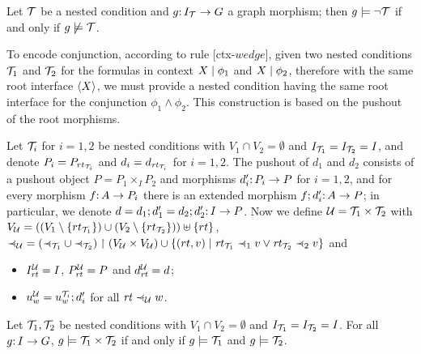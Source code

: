 \begin{proposition}
	\label{pr:negation satisfaction}
Let ${\mathcal{T}}$ be a {\proper} nested condition and $g{:}\, I_{\mathcal{T}}\rightarrow G$ a graph morphism; then $g\models \neg{\mathcal{T}}$ if and only if $g\not\models{\mathcal{T}}$.
\end{proposition}

To encode conjunction, according to rule [ctx-$wedge$], given two {\proper} nested conditions ${\mathcal{T}}_1$ and ${\mathcal{T}}_2$ for the formulas in context ${X} \mid {\phi_1}$ and ${X} \mid {\phi_2}$, therefore with the same root interface $\langle X\rangle$, we must provide a {\proper} nested condition having the same root interface for the conjunction $\phi_1 \wedge \phi_2$. This construction is based on the pushout of the root morphisms. 

Let ${\mathcal{T}}_i$ for $i=1,2$ be {\proper} nested conditions with $V_1\cap V_2= \emptyset $ and $I_{{\mathcal{T}}_1}=I_{{\mathcal{T}}_2}=I$, and denote $P_i=P_{rt_{{\mathcal{T}}_i}}$ and $d_i=d_{\mathit{rt}_{{\mathcal{T}}_i}}$ for $i=1,2$. The pushout of $d_1$ and $d_2$ consists of a pushout object $P=P_1\times_I P_2$ and morphisms $d'_i{:}\, P_i\rightarrow P$ for $i=1,2$, and for every morphism $f{:}\, A\rightarrow P_i$ there is an extended morphism $f;d'_i{:}\, A\rightarrow P$; in particular, we denote $d=d_1;d'_1=d_2;d'_2{:}\, I\rightarrow P$.  Now we define ${\mathcal{U}}={\mathcal{T}}_1\times {\mathcal{T}}_2$ with $V_{\mathcal{U}}=((V_1\setminus \{{rt_{{\mathcal{T}}_1}}\})\cup (V_2\setminus \{{rt_{{\mathcal{T}}_2}}\})) \uplus \{{rt}\}$,
${\parentof[\cU]}= ({\parentof[\cT_1]}\cup {\parentof[\cT_2]})\restr (V_\cU \times V_\cU) \cup \{(rt, v) \mid \rt_{\cT_1}\parentof[1] v \vee \rt_{\cT_2}\parentof[2] v\}$ and
%
\begin{itemize}
\item $I^{\mathcal{U}}_{\mathit{rt}}=I$, $P^{\mathcal{U}}_{\mathit{rt}}=P$ and $d^{\mathcal{U}}_{\mathit{rt}}=d$;
\item $u^{\mathcal{U}}_w=u^{{\mathcal{T}}_i}_w;d'_i$ for all $\rt \parentof[\cU] w$.
\end{itemize}

\begin{proposition}
	\label{pr:and satisfaction}
Let ${\mathcal{T}}_1,{\mathcal{T}}_2$ be {\proper} nested conditions with  $V_1\cap V_2=\emptyset$ and $I_{{\mathcal{T}}_1}=I_{{\mathcal{T}}_2}=I$. For all $g{:}\, I\rightarrow G$, $g\models {\mathcal{T}}_1\times {\mathcal{T}}_2$ if and only if $g\models{\mathcal{T}}_1$ and $g\models {\mathcal{T}}_2$.
\end{proposition}
%

